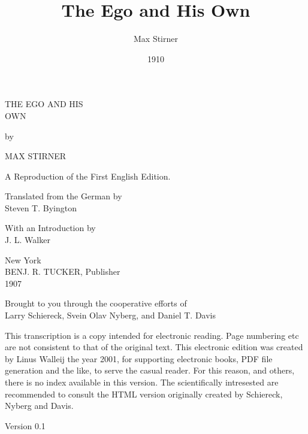 \documentclass[a4paper]{book}
\title{The Ego and His Own}
\author{Max Stirner}
\date{1910}
\begin{document}
\maketitle

\tableofcontents

\newpage{}

\begin{center}
{\Huge THE EGO AND HIS\\
\medskip{}
OWN}

\medskip{}

by

\medskip{}

{\Huge MAX STIRNER}

\medskip{}

A Reproduction of the First English Edition.

\medskip{}

Translated from the German by\\
Steven T. Byington

\medskip{}

With an Introduction by\\
 J. L. Walker

\medskip{}

New York\\
BENJ. R. TUCKER, Publisher\\
1907

\medskip{}

Brought to you through the cooperative efforts of\\
Larry Schiereck, Svein Olav Nyberg, and Daniel T. Davis

\end{center}

\medskip{}

\noindent{}This transcription is a copy intended for 
electronic reading. Page numbering 
etc are not consistent to that of the original text. This electronic edition 
was created by Linus Walleij the year 2001, for supporting electronic books, 
PDF file generation and the like, to serve the casual reader. For this reason, 
and others, there is no index available in this version. The scientifically 
intresested are recommended to consult the HTML version originally created by 
Schiereck, Nyberg and Davis.

\medskip{}

\begin{center}
Version 0.1\end{center}

\medskip{}
\end{document}
